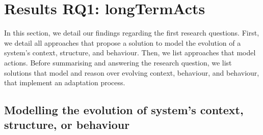 \section[Results RQ1: long-term actions]{Results RQ1: \glspl{longTermAct}}
\label{sec:sota:results:actions}

In this section, we detail our findings regarding the first research questions.
First, we detail all approaches that propose a solution to model the evolution of a system's \gls{context}, \gls{structure}, and \gls{behaviour}.
Then, we list approaches that model \glspl{action}.
Before summarising and answering the research question, we list solutions that model and reason over evolving \gls{context}, \gls{behaviour}, and \gls{behaviour}, \ie that implement an adaptation process.

\subsection[Modelling the evolution of system's context, structure, or behaviour]{Modelling the evolution of system's \gls{context}, \gls{structure}, or \gls{behaviour}}

